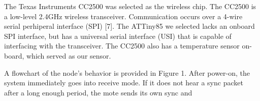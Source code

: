 The Texas Instruments CC2500 was selected as the wireless chip. The CC2500 is a low-level 2.4GHz wireless transceiver. Communication occurs over a 4-wire serial perhiperal interface (SPI) [7]. The ATTiny85 we selected lacks an onboard SPI interface, but has a universal serial interface (USI) that is capable of interfacing with the transceiver. The CC2500 also has a temperature sensor on-board, which served as our sensor. 

A flowchart of the node’s behavior is provided in Figure 1. After power-on, the system immediately goes into receive mode. If it does not hear a sync packet after a long enough period, the mote sends its own sync and 
